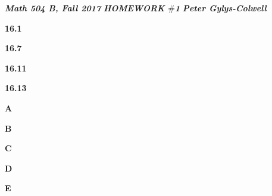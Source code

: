\documentclass[12pt]{article}
\newenvironment{ques}{\vspace{2 ex}}{\vspace{2 ex}}
\theoremstyle{definition}
\begin{document}
\noindent \textit{\textbf{Math 504 B, Fall 2017}} \hspace{1.3cm}
\textit{\textbf{HOMEWORK $\#$1}} \hspace{1.3cm} \textit{\textbf{Peter
Gylys-Colwell}} 

\vspace{1cm}

\begin{ques}
	\textbf{16.1}
\end{ques}

\begin{ques}
	\textbf{16.7}
\end{ques}

\begin{ques}
	\textbf{16.11}
\end{ques}

\begin{ques}
	\textbf{16.13}
\end{ques}

\begin{ques}
	\textbf{A}
\end{ques}

\begin{ques}
	\textbf{B}
\end{ques}

\begin{ques}
	\textbf{C}
\end{ques}

\begin{ques}
	\textbf{D}
\end{ques}

\begin{ques}
	\textbf{E}
\end{ques}
\end{document}
